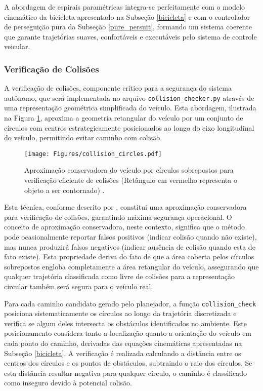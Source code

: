 A abordagem de espirais paramétricas integra-se perfeitamente com o modelo cinemático da bicicleta apresentado na Subseção \ref{bicicleta} e com o controlador de perseguição pura da Subseção \ref{pure_persuit}, formando um sistema coerente que garante trajetórias suaves, confortáveis e executáveis pelo sistema de controle veicular.

\subsubsection{Verificação de Colisões} \label{verificacao_colisoes}

A verificação de colisões, componente crítico para a segurança do sistema autônomo, que será implementada no arquivo \texttt{collision\_checker.py} através de uma representação geométrica simplificada do veículo. Esta abordagem, ilustrada na Figura \ref{collision_circles}, aproxima a geometria retangular do veículo por um conjunto de círculos com centros estrategicamente posicionados ao longo do eixo longitudinal do veículo, permitindo evitar caminho com colisão.

\begin{figure}[H]
\centering
\texttt{[image: Figures/collision\_circles.pdf]}
\caption{Aproximação conservadora do veículo por círculos sobrepostos para verificação eficiente de colisões (Retângulo em vermelho representa o objeto a ser contornado) \cite[Module 8 - Lesson 4: Conformal Lattice Planning. ~10min]{University_of_Toronto2018-mp}.}
\label{collision_circles}
\end{figure}

Esta técnica, conforme descrito por , constitui uma aproximação conservadora para verificação de colisões, garantindo máxima segurança operacional. O conceito de aproximação conservadora, neste contexto, significa que o método pode ocasionalmente reportar falsos positivos (indicar colisão quando não existe), mas nunca produzirá falsos negativos (indicar ausência de colisão quando esta de fato existe). Esta propriedade deriva do fato de que a área coberta pelos círculos sobrepostos engloba completamente a área retangular do veículo, assegurando que qualquer trajetória classificada como livre de colisões para a representação circular também será segura para o veículo real.

Para cada caminho candidato gerado pelo planejador, a função \texttt{collision\_check} posiciona sistematicamente os círculos ao longo da trajetória discretizada e verifica se algum deles intersecta os obstáculos identificados no ambiente. Este posicionamento considera tanto a localização quanto a orientação do veículo em cada ponto do caminho, derivadas das equações cinemáticas apresentadas na Subseção \ref{bicicleta}. A verificação é realizada calculando a distância entre os centros dos círculos e os pontos de obstáculos, subtraindo o raio dos círculos. Se esta distância resultar negativa para qualquer círculo, o caminho é classificado como inseguro devido à potencial colisão.

